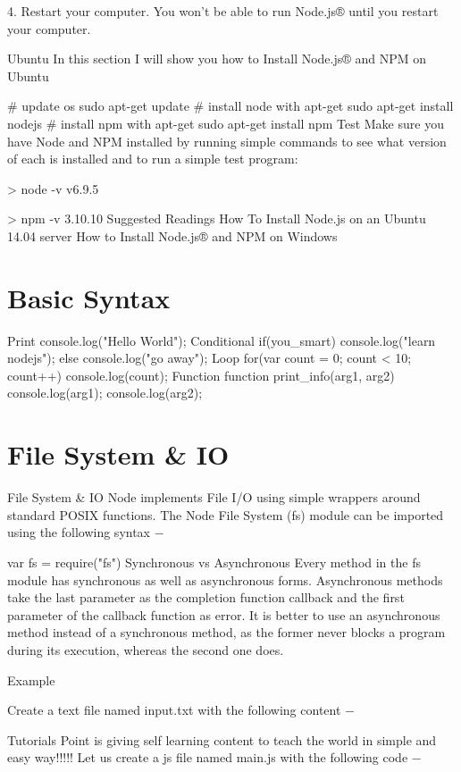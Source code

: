 4. Restart your computer. You won’t be able to run Node.js® until you restart your computer.

Ubuntu
In this section I will show you how to Install Node.js® and NPM on Ubuntu

# update os
sudo apt-get update
# install node with apt-get
sudo apt-get install nodejs
# install npm with apt-get
sudo apt-get install npm
Test
Make sure you have Node and NPM installed by running simple commands to see what version of each is installed and to run a simple test program:

> node -v
v6.9.5

> npm -v
3.10.10
Suggested Readings
How To Install Node.js on an Ubuntu 14.04 server
How to Install Node.js® and NPM on Windows

\section{Basic Syntax}

Print
console.log("Hello World");
Conditional
if(you_smart){
    console.log("learn nodejs");
} else {
    console.log("go away");
}
Loop
for(var count = 0; count < 10; count++){
    console.log(count);
}
Function
function print_info(arg1, arg2){
    console.log(arg1);
    console.log(arg2);
}

\section{File System & IO}

File System & IO
Node implements File I/O using simple wrappers around standard POSIX functions. The Node File System (fs) module can be imported using the following syntax −

var fs = require("fs")
Synchronous vs Asynchronous
Every method in the fs module has synchronous as well as asynchronous forms. Asynchronous methods take the last parameter as the completion function callback and the first parameter of the callback function as error. It is better to use an asynchronous method instead of a synchronous method, as the former never blocks a program during its execution, whereas the second one does.

Example

Create a text file named input.txt with the following content −

Tutorials Point is giving self learning content
to teach the world in simple and easy way!!!!!
Let us create a js file named main.js with the following code −


